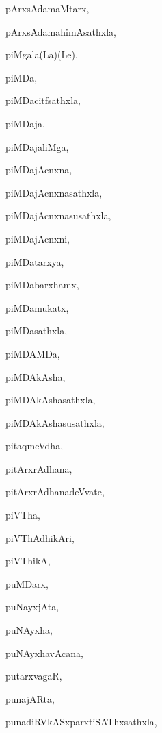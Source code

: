 \begin{multicols}{2}
{pArxsAdamaMtarx}, \pageref{pArxsAdamaMtarx}

{pArxsAdamahimAsathxla}, \pageref{pArxsAdamahimAsathxla}

{piMgala(La)(Le)}, \pageref{piMgalaLaLe}

{piMDa}, \pageref{piMDa}

{piMDacitfsathxla}, \pageref{piMDacitfsathxla}

{piMDaja}, \pageref{piMDaja}

{piMDajaliMga}, \pageref{piMDajaliMga}

{piMDajAcnxna}, \pageref{piMDajAcnxna}

{piMDajAcnxnasathxla}, \pageref{piMDajAcnxnasathxla}

{piMDajAcnxnasusathxla}, \pageref{piMDajAcnxnasusathxla}

{piMDajAcnxni}, \pageref{piMDajAcnxni}

{piMDatarxya}, \pageref{piMDatarxya}

{piMDabarxhamx}, \pageref{piMDabarxhamx}

{piMDamukatx}, \pageref{piMDamukatx}

{piMDasathxla}, \pageref{piMDasathxla}

{piMDAMDa}, \pageref{piMDAMDa}

{piMDAkAsha}, \pageref{piMDAkAsha}

{piMDAkAshasathxla}, \pageref{piMDAkAshasathxla}

{piMDAkAshasusathxla}, \pageref{piMDAkAshasusathxla}

{pitaqmeVdha}, \pageref{pitaqmeVdha}

{pitArxrAdhana}, \pageref{pitArxrAdhana}

{pitArxrAdhanadeVvate}, \pageref{pitArxrAdhanadeVvate}

{piVTha}, \pageref{piVTha}

{piVThAdhikAri}, \pageref{piVThAdhikAri}

{piVThikA}, \pageref{piVThikA}

{puMDarx}, \pageref{puMDarx}

{puNayxjAta}, \pageref{puNayxjAta}

{puNAyxha}, \pageref{puNAyxha}

{puNAyxhavAcana}, \pageref{puNAyxhavAcana}

{putarxvagaR}, \pageref{putarxvagaR}

{punajARta}, \pageref{punajARta}

{punadiRVkASxparxtiSAThxsathxla}, \pageref{punadiRVkASxparxtiSAThxsathxla}


\end{multicols}
